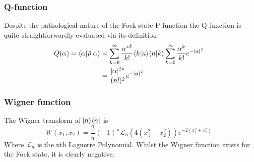 \subsubsection{Q-function}

Despite the pathological nature of the Fock state P-function the Q-function is quite straightforwardly evaluated via its definition
\begin{align}
	 Q(\alpha) = \langle \alpha | \hat{\rho} | \alpha \rangle  &= \sum_{k=0}^\infty \frac {{\alpha^*}^k}{k!} \langle k | n \rangle\langle n | k \rangle \sum_{k=0}^\infty \frac {\alpha^k}{k!}e^{-|\alpha|^2} \\ &= \frac{|\alpha|^{2n}}{(n!)^2} e^{-|\alpha|^2}
\end{align}

\subsubsection{Wigner function}

The Wigner transform of $| n \rangle\langle n |$ is\autocite[65]{Walls2008}
\begin{equation}
	W(x_1, x_2) = \frac{2}{\pi} (-1)^n \mathscr{L}_n(4(x_1^2+x_2^2))e^{-2(x_1^2+x_2^2)}
\end{equation}
Where $\mathscr{L}_n$ is the nth Laguerre Polynomial. Whilst the Wigner function exists for the Fock state, it is clearly negative.